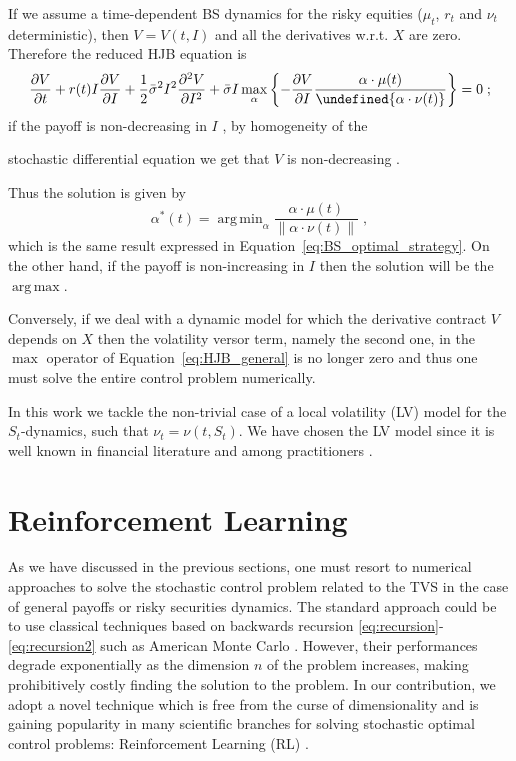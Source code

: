 \documentclass[runningheads]{m2ef}
\DeclareMathOperator*{\argmax}{arg\,max}
\DeclareMathOperator*{\argmin}{arg\,min}
\let\norm\undefined %
\DeclarePairedDelimiter\norm{\lVert}{\rVert}
\newcommand\soutpars[1]{\let\helpcmd\sout\parhelp#1\par\relax\relax}
\newcommand{\change}[1]{{\color{red} {#1}}}%
\newcommand{\remove}[1]{{\color{red} \soutpars{{#1}}}}%
\begin{document}
If we assume a time-dependent BS dynamics for the risky equities ($\mu_t$, $r_t$ and $\nu_t$ deterministic), then $V = V(t,I)$ and all the derivatives w.r.t. $X$ are zero. Therefore the reduced HJB equation is
\begin{equation}
	\frac{\partial V}{\partial t} +  r(t) I \frac{\partial V}{\partial I}  + \frac{1}{2}\bar{\sigma}^2I^2\frac{\partial^2V}{\partial I^2} + \bar{\sigma}I\max_\alpha \left\{ -\frac{\partial V}{\partial I}   \frac{\alpha \cdot \mu(t)}{\norm{\alpha \cdot \nu(t)}}\right\} = 0 \; ;
\end{equation}
if the payoff is non-decreasing in $I$\change{,} by homogeneity of the \remove{SDE} \change{stochastic differential equation} we get that $V$ is non-decreasing\change{.}\remove{; t}\change{T}hus the solution is given by
\begin{equation}
 \alpha^*(t) = \argmin_\alpha \frac{\alpha \cdot \mu(t)}{\|\alpha \cdot \nu(t)\|} \; ,
	\end{equation}
which is the same result expressed in Equation~\eqref{eq:BS_optimal_strategy}. On the other hand, if the payoff is non-increasing in $I$ then the solution will be the $\argmax$.

Conversely, if we deal with a dynamic model for which the derivative contract $V$ depends on $X$ then the volatility versor term, namely the second one, in the $\max$ operator of Equation~\eqref{eq:HJB_general} is no longer zero and thus one must solve the entire control problem numerically. 

In this work we tackle the non-trivial case of a local volatility (LV) model for the $S_t$-dynamics, such that $\nu_t = \nu(t,S_t)$. We have chosen the LV model since it is well known in financial literature and among practitioners \change{\cite{Gatheral2006}}.


\section{Reinforcement \change{L}earning}\label{sec:RL}
As we have discussed in the previous sections, one must resort to numerical approaches to solve the stochastic control problem related to the TVS in the case of general payoffs or risky securities dynamics. The standard approach could be to use classical techniques based on backwards recursion \eqref{eq:recursion}-\eqref{eq:recursion2} such as American Monte Carlo \cite{Longstaff2001}. However, their performances degrade exponentially as the dimension $n$ of the problem increases, making prohibitively costly finding the solution to the problem. In our contribution, we adopt a novel technique which is free from the curse of dimensionality and is gaining popularity in many scientific branches for solving stochastic optimal control problems: Reinforcement Learning (RL) \cite{Sutton2018}. 
\end{document}
